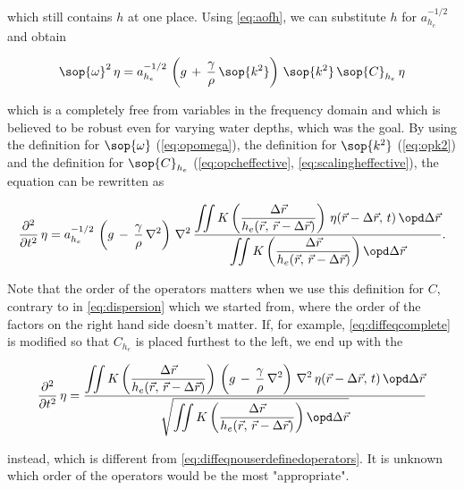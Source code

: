 which still contains $h$ at one place. Using \eqref{eq:aofh}, we can substitute $h$ for $a_{h_e}^{-1/2}$ and obtain

\begin{equation} \label{eq:diffeqcomplete}
\sop{\omega}^2\,\eta = a_{h_e}^{-1/2}\,\left(g\,+\,\frac{\gamma}{\rho}\,\sop{k^2}\right)\,\sop{k^2}\,\sop{C}_{h_e}\,\eta
\end{equation}

which is a \PDE completely free from variables in the frequency domain and which is believed to be robust even for varying water depths, which was the goal. By using the definition for $\sop{\omega}$ (\eqref{eq:opomega}), the definition for $\sop{k^2}$ (\eqref{eq:opk2}) and the definition for $\sop{C}_{h_e}$ (\eqref{eq:opcheffective}, \eqref{eq:scalingheffective}), the equation can be rewritten as

\begin{equation} \label{eq:diffeqnouserdefinedoperators}
\frac{\partial^2}{\partial t^2}\,\eta = a_{h_e}^{-1/2}\,\left(g\,-\,\frac{\gamma}{\rho}\,\nabla^2\right)\,\nabla^2\,\frac{\displaystyle\iint K\left(\frac{\Delta\vec{r}}{h_e(\vec{r},\,\vec{r}-\Delta\vec{r})}\right)\,\eta(\vec{r}-\Delta\vec{r},\,t)\,\opd\Delta\vec{r}}{\displaystyle\iint K\left(\frac{\Delta\vec{r}}{h_e(\vec{r},\,\vec{r}-\Delta\vec{r})}\right) \opd\Delta\vec{r}}.
\end{equation}

Note that the order of the operators matters when we use this definition for $C$, contrary to in \eqref{eq:dispersion} which we started from, where the order of the factors on the right hand side doesn't matter. If, for example, \eqref{eq:diffeqcomplete} is modified so that $C_{h_e}$ is placed furthest to the left, we end up with the \PDE

\begin{equation} \label{eq:diffeqnouserdefinedoperatorsvariant}
\frac{\partial^2}{\partial t^2}\,\eta = \frac{\displaystyle\iint K\left(\frac{\Delta\vec{r}}{h_e(\vec{r},\,\vec{r}-\Delta\vec{r})}\right)\,\left(g\,-\,\frac{\gamma}{\rho}\,\nabla^2\right)\,\nabla^2\,\eta(\vec{r}-\Delta\vec{r},\,t)\,\opd\Delta\vec{r}}{\sqrt{\displaystyle\iint K\left(\frac{\Delta\vec{r}}{h_e(\vec{r},\,\vec{r}-\Delta\vec{r})}\right) \opd\Delta\vec{r}}}
\end{equation}

instead, which is different from \eqref{eq:diffeqnouserdefinedoperators}. It is unknown which order of the operators would be the most "appropriate".

